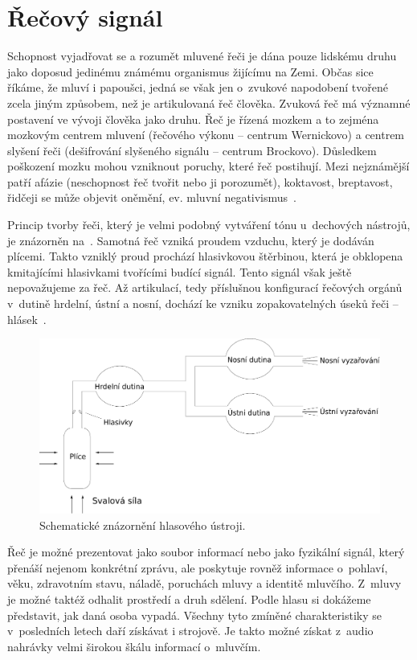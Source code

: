 \section{Řečový signál}
\label{section:Speech_signal}
Schopnost vyjadřovat se a rozumět mluvené řeči je dána pouze lidskému druhu jako doposud jedinému známému organismus žijícímu na Zemi. Občas sice říkáme, že mluví i papoušci, jedná se však jen o~zvukové napodobení tvořené zcela jiným způsobem, než je artikulovaná řeč člověka. Zvuková řeč má významné postavení ve vývoji člověka jako druhu. Řeč je řízená mozkem a to zejména mozkovým centrem mluvení (řečového výkonu -- centrum Wernickovo) a centrem slyšení řeči (dešifrování slyšeného signálu -- centrum Brockovo). Důsledkem poškození mozku mohou vzniknout poruchy, které řeč postihují. Mezi nejznámější patří afázie (neschopnost řeč tvořit nebo ji porozumět), koktavost, breptavost, řidčeji se může objevit oněmění, ev. mluvní negativismus~\cite{Fonetika_Krcmova}.

Princip tvorby řeči, který je velmi podobný vytváření tónu u~dechových nástrojů, je znázorněn na~. Samotná řeč vzniká proudem vzduchu, který je dodáván plícemi. Takto vzniklý proud prochází hlasivkovou štěrbinou, která je obklopena kmitajícími hlasivkami tvořícími budící signál. Tento signál však ještě nepovažujeme za řeč. Až artikulací, tedy příslušnou konfigurací řečových orgánů v~dutině hrdelní, ústní a nosní, dochází ke vzniku zopakovatelných úseků řeči -- hlásek~\cite{Sigmund_Analyza}.

\begin{figure}[ht]
  \centering
  \includegraphics[width=\linewidth]{obrazky-figures/vocal_tract.pdf}
  \caption{Schematické znázornění hlasového ústroji.}
  \label{fig:VoiceCreationSchema}
\end{figure}

Řeč je možné prezentovat jako soubor informací nebo jako fyzikální signál, který přenáší nejenom konkrétní zprávu, ale poskytuje rovněž informace o~pohlaví, věku, zdravotním stavu, náladě, poruchách mluvy a identitě mluvčího. Z~mluvy je možné taktéž odhalit prostředí a druh sdělení. Podle hlasu si dokážeme představit, jak daná osoba vypadá. Všechny tyto zmíněné charakteristiky se v~posledních letech daří získávat i strojově. Je takto možné získat z~audio nahrávky velmi širokou škálu informací o~mluvčím.    

